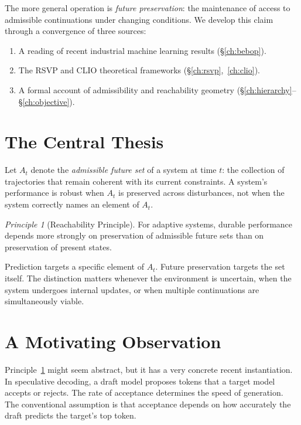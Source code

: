 \documentclass[11pt, a4paper, openany]{book}
\theoremstyle{plain}
\theoremstyle{definition}
\theoremstyle{remark}
\newtheorem{principle}{Principle}
\begin{document}
The more general operation is \emph{future preservation}: the maintenance of
access to admissible continuations under changing conditions.
We develop this claim through a convergence of three sources:
\begin{enumerate}
  \item A reading of recent industrial machine learning results (§\ref{ch:bebop}).
  \item The RSVP and CLIO theoretical frameworks (§\ref{ch:rsvp},~\ref{ch:clio}).
  \item A formal account of admissibility and reachability geometry
        (§\ref{ch:hierarchy}--§\ref{ch:objective}).
\end{enumerate}

\section{The Central Thesis}

Let $A_t$ denote the \emph{admissible future set} of a system at time $t$:
the collection of trajectories that remain coherent with its current constraints.
A system's performance is robust when $A_t$ is preserved across disturbances,
not when the system correctly names an element of $A_t$.

\begin{principle}[Reachability Principle]\label{prin:reachability}
For adaptive systems, durable performance depends more strongly on
preservation of admissible future sets than on preservation of present states.
\end{principle}

Prediction targets a specific element of $A_t$.
Future preservation targets the set itself.
The distinction matters whenever the environment is uncertain, when
the system undergoes internal updates, or when multiple continuations
are simultaneously viable.

\section{A Motivating Observation}

Principle~\ref{prin:reachability} might seem abstract, but it has a very
concrete recent instantiation.
In speculative decoding, a draft model proposes tokens that a target model
accepts or rejects.
The rate of acceptance determines the speed of generation.
The conventional assumption is that acceptance depends on how accurately
the draft predicts the target's top token.
\end{document}
